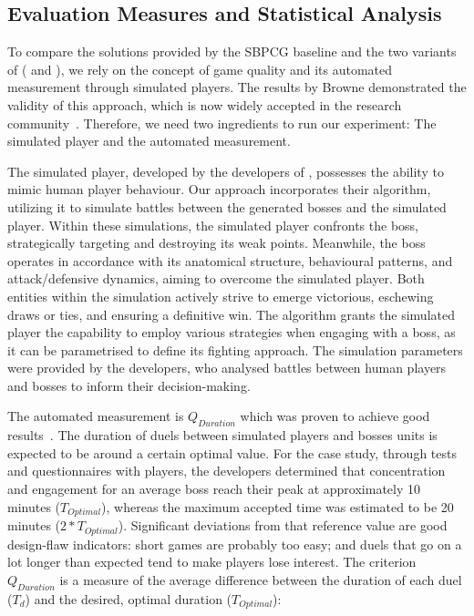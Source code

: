 \subsection{Evaluation Measures and Statistical Analysis}
To compare the solutions provided by the SBPCG baseline and the two variants of \ApproachName{} (\simhotep{} and \timhotep{}), we rely on the concept of game quality and its automated measurement through simulated players. The results by Browne \etal demonstrated the validity of this approach, which is now widely accepted in the research community~\cite{browne2010evolutionary}. Therefore, we need two ingredients to run our experiment: The simulated player and the automated measurement.

The simulated player, developed by the developers of  \CaseStudy{}, possesses the ability to mimic human player behaviour. Our approach incorporates their algorithm, utilizing it to simulate battles between the generated bosses and the simulated player. Within these simulations, the simulated player confronts the boss, strategically targeting and destroying its weak points. Meanwhile, the boss operates in accordance with its anatomical structure, behavioural patterns, and attack/defensive dynamics, aiming to overcome the simulated player. Both entities within the simulation actively strive to emerge victorious, eschewing draws or ties, and ensuring a definitive win. The algorithm grants the simulated player the capability to employ various strategies when engaging with a boss, as it can be parametrised to define its fighting approach. The simulation parameters were provided by the developers, who analysed battles between human players and bosses to inform their decision-making.

The automated measurement is $Q_{Duration}$ which was proven to achieve good results~\cite{browne2010evolutionary}. The duration of duels between simulated players and bosses units is expected to be around a certain optimal value. For the \CaseStudy{} case study, through tests and questionnaires with players, the developers determined that concentration and engagement for an average boss reach their peak at approximately 10 minutes ($T_{Optimal}$), whereas the maximum accepted time was estimated to be 20 minutes ($2*T_{Optimal}$). Significant deviations from that reference value are good design-flaw indicators: short games are probably too easy; and duels that go on a lot longer than expected tend to make players lose interest. The criterion $Q_{Duration}$ is a measure of the average difference between the duration of each duel ($T_{d}$) and the desired, optimal duration ($T_{Optimal}$):

